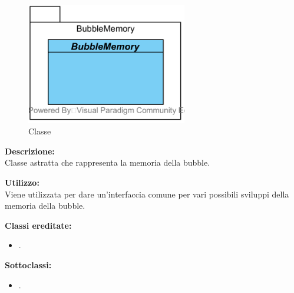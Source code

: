 \paragraph[::BubbleMemory::BubbleMemory]{\class}\mbox{}\\ \label{class}
\begin{figure}[H]
	\centering
	\includegraphics[width=7cm]{./diagrammi/framework/model/bubblememory.png}
	\caption{Classe \class}
\end{figure}

\textbf{Descrizione:}\\
Classe astratta che rappresenta la memoria della bubble.

\textbf{Utilizzo:}\\
Viene utilizzata per dare un'interfaccia comune per vari possibili sviluppi della memoria della bubble.

\textbf{Classi ereditate:}
\begin{itemize}
	\item {}.
\end{itemize}

\textbf{Sottoclassi:}
\begin{itemize}
	\item {}.
\end{itemize}

%


